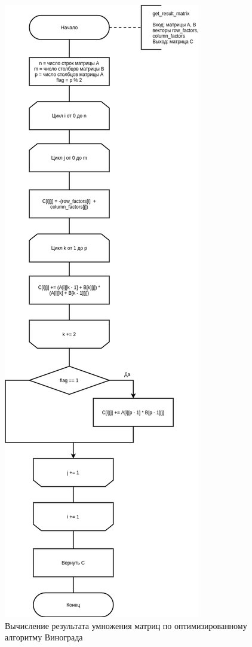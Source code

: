 \begin{figure}[H]
	\begin{center}
		\includegraphics[scale=0.4]{img/result_optimized.png}
	\end{center}
	\captionsetup{justification=centering}
	\caption{Вычисление результата умножения матриц по оптимизированному алгоритму Винограда}
	\label{img:result_optimized}
\end{figure}


